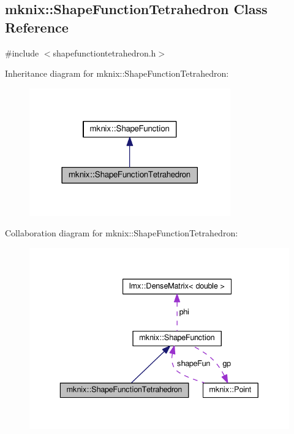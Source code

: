 \hypertarget{classmknix_1_1_shape_function_tetrahedron}{}\subsection{mknix\+:\+:Shape\+Function\+Tetrahedron Class Reference}
\label{classmknix_1_1_shape_function_tetrahedron}


{\ttfamily \#include $<$shapefunctiontetrahedron.\+h$>$}



Inheritance diagram for mknix\+:\+:Shape\+Function\+Tetrahedron\+:\nopagebreak
\begin{figure}[H]
\begin{center}
\leavevmode
\includegraphics[width=246pt]{d3/db6/classmknix_1_1_shape_function_tetrahedron__inherit__graph}
\end{center}
\end{figure}


Collaboration diagram for mknix\+:\+:Shape\+Function\+Tetrahedron\+:\nopagebreak
\begin{figure}[H]
\begin{center}
\leavevmode
\includegraphics[width=336pt]{dc/dc9/classmknix_1_1_shape_function_tetrahedron__coll__graph}
\end{center}
\end{figure}

